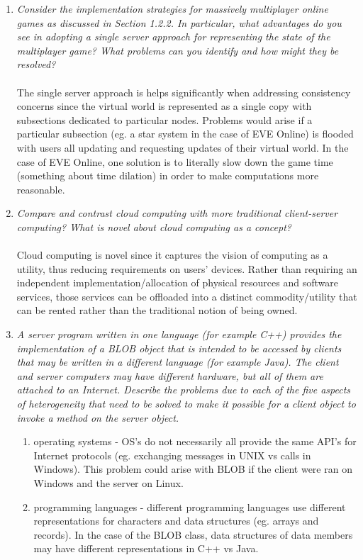 \documentclass[11pt]{article}
\theoremstyle{plain}
\theoremstyle{definition}
\begin{document}
\begin{enumerate}
	\item \textit{Consider the implementation strategies for massively multiplayer online games as discussed in Section 1.2.2. In particular, what advantages do you see in adopting a single server approach for representing the state of the multiplayer game? What problems can you identify and how might they be resolved? }\\
	\\
	The single server approach is helps significantly when addressing consistency concerns since the virtual world is represented as a single copy with subsections dedicated to particular nodes. Problems would arise if a particular subsection (eg. a star system in the case of EVE Online) is flooded with users all updating and requesting updates of their virtual world. In the case of EVE Online, one solution is to literally slow down the game time (something about time dilation) in order to make computations more reasonable.
	\item \textit{Compare and contrast cloud computing with more traditional client-server computing? What is novel about cloud computing as a concept?} \\
	\\
	Cloud computing is novel since it captures the vision of computing as a utility, thus reducing requirements on users' devices. Rather than requiring an independent implementation/allocation of physical resources and software services, those services can be offloaded into a distinct commodity/utility that can be rented rather than the traditional notion of being owned.
	\item \textit{A server program written in one language (for example C++) provides the implementation of a BLOB object that is intended to be accessed by clients that may be written in a different language (for example Java). The client and server computers may have different hardware, but all of them are attached to an Internet. Describe the problems due to each of the five aspects of heterogeneity that need to be solved to make it possible for a client object to invoke a method on the server object.}
	\begin{enumerate}[\hspace{0.5cm}(1)]
		\item operating systems - OS's do not necessarily all provide the same API's for Internet protocols (eg. exchanging messages in UNIX vs calls in Windows). This problem could arise with BLOB if the client were ran on Windows and the server on Linux.
		\item programming languages - different programming languages use different representations for characters and data structures (eg. arrays and records). In the case of the BLOB class, data structures of data members may have different representations in C++ vs Java.

\end{enumerate}
\end{enumerate}
\end{document}

